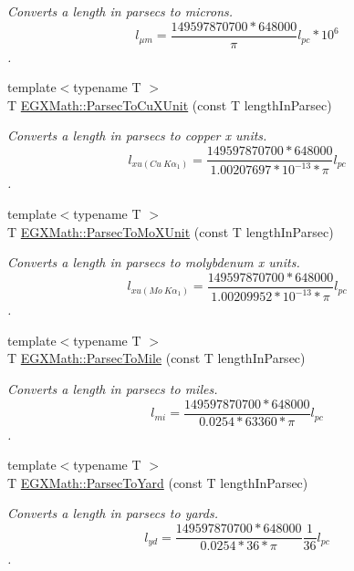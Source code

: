 \begin{DoxyCompactItemize}
\begin{DoxyCompactList}\small\item\em Converts a length in parsecs to microns. \[ l_{\mu m}=\frac{149597870700 * 648000}{\pi}l_{pc} * 10^{6} \]. \end{DoxyCompactList}\item 
{\footnotesize template$<$typename T $>$ }\\T \mbox{\hyperlink{group___e_g_x_math-_conversions-_length_conversions-_astronomical-_parsec-_non-_s_i_gad21a910de08e37197d58edf64c377222}{E\+G\+X\+Math\+::\+Parsec\+To\+Cu\+X\+Unit}} (const T length\+In\+Parsec)
\begin{DoxyCompactList}\small\item\em Converts a length in parsecs to copper x units. \[ l_{xu(Cu\ K\alpha_1)}= \frac{149597870700 * 648000}{1.00207697*10^{-13} * \pi} l_{pc}\]. \end{DoxyCompactList}\item 
{\footnotesize template$<$typename T $>$ }\\T \mbox{\hyperlink{group___e_g_x_math-_conversions-_length_conversions-_astronomical-_parsec-_non-_s_i_gaf076c4eb125bbc9fbabc040300961b6d}{E\+G\+X\+Math\+::\+Parsec\+To\+Mo\+X\+Unit}} (const T length\+In\+Parsec)
\begin{DoxyCompactList}\small\item\em Converts a length in parsecs to molybdenum x units. \[ l_{xu(Mo\ K\alpha_1)}=\frac{149597870700 * 648000}{1.00209952*10^{-13}* \pi} l_{pc}\]. \end{DoxyCompactList}\item 
{\footnotesize template$<$typename T $>$ }\\T \mbox{\hyperlink{group___e_g_x_math-_conversions-_length_conversions-_astronomical-_parsec-_imperial_gaff2c298a0830dd20dc3acce2d9d789f8}{E\+G\+X\+Math\+::\+Parsec\+To\+Mile}} (const T length\+In\+Parsec)
\begin{DoxyCompactList}\small\item\em Converts a length in parsecs to miles. \[ l_{mi}=\frac{149597870700 * 648000}{ 0.0254 * 63360 * \pi} l_{pc} \]. \end{DoxyCompactList}\item 
{\footnotesize template$<$typename T $>$ }\\T \mbox{\hyperlink{group___e_g_x_math-_conversions-_length_conversions-_astronomical-_parsec-_imperial_gae9ae73b70979fb012736516147854cf4}{E\+G\+X\+Math\+::\+Parsec\+To\+Yard}} (const T length\+In\+Parsec)
\begin{DoxyCompactList}\small\item\em Converts a length in parsecs to yards. \[ l_{yd}= \frac{149597870700 * 648000}{0.0254 * 36 * \pi} \frac{1}{36} l_{pc} \]. \end{DoxyCompactList}\item 

\end{DoxyCompactItemize}
